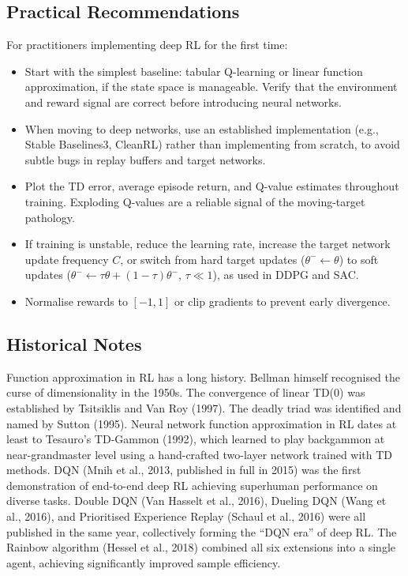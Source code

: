 \subsection{Practical Recommendations}

For practitioners implementing deep RL for the first time:
\begin{itemize}[leftmargin=*]
\item Start with the simplest baseline: tabular Q-learning or linear function approximation, if
  the state space is manageable.  Verify that the environment and reward signal are correct before
  introducing neural networks.
\item When moving to deep networks, use an established implementation (e.g., Stable Baselines3,
  CleanRL) rather than implementing from scratch, to avoid subtle bugs in replay buffers and target
  networks.
\item Plot the TD error, average episode return, and Q-value estimates throughout training.
  Exploding Q-values are a reliable signal of the moving-target pathology.
\item If training is unstable, reduce the learning rate, increase the target network update
  frequency $C$, or switch from hard target updates ($\theta^- \leftarrow \theta$) to soft updates
  ($\theta^- \leftarrow \tau\theta + (1-\tau)\theta^-$, $\tau \ll 1$), as used in DDPG and SAC.
\item Normalise rewards to $[-1, 1]$ or clip gradients to prevent early divergence.
\end{itemize}

\subsection{Historical Notes}

Function approximation in RL has a long history.  Bellman himself recognised the curse of
dimensionality in the 1950s.  The convergence of linear TD(0) was established by Tsitsiklis and
Van Roy (1997).  The deadly triad was identified and named by Sutton (1995).  Neural network
function approximation in RL dates at least to Tesauro's TD-Gammon (1992), which learned to play
backgammon at near-grandmaster level using a hand-crafted two-layer network trained with TD
methods.  DQN (Mnih et al., 2013, published in full in 2015) was the first demonstration of
end-to-end deep RL achieving superhuman performance on diverse tasks.  Double DQN (Van Hasselt et
al., 2016), Dueling DQN (Wang et al., 2016), and Prioritised Experience Replay (Schaul et al.,
2016) were all published in the same year, collectively forming the ``DQN era'' of deep RL.  The
Rainbow algorithm (Hessel et al., 2018) combined all six extensions into a single agent, achieving
significantly improved sample efficiency.

